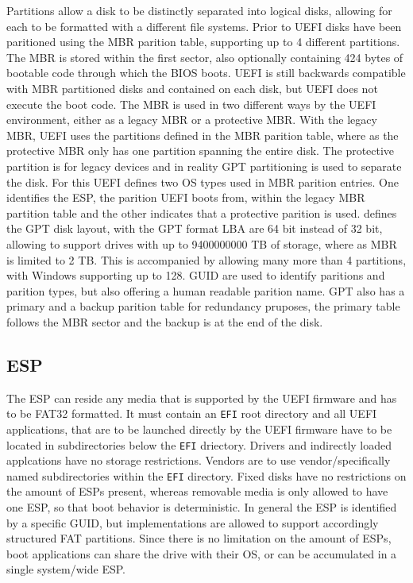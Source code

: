Partitions allow a disk to be distinctly separated into logical disks, allowing for each to be formatted with a different file systems.
Prior to \ac{UEFI} disks have been paritioned using the \ac{MBR} parition table, supporting up to 4 different partitions.
The \ac{MBR} is stored within the first sector, also optionally containing 424 bytes of bootable code through which the \ac{BIOS} boots\cite[13.3.1]{uefi-spec}.
\ac{UEFI} is still backwards compatible with \ac{MBR} partitioned disks and contained on each disk, but \ac{UEFI} does not execute the boot code.
The \ac{MBR} is used in two different ways by the \ac{UEFI} environment, either as a legacy \ac{MBR} or a protective \ac{MBR}.
With the legacy \ac{MBR}, \ac{UEFI} uses the partitions defined in the \ac{MBR} parition table, where as the protective \ac{MBR} only has one partition spanning the entire disk.
The protective partition is for legacy devices and in reality \ac{GPT} partitioning is used to separate the disk.
For this \ac{UEFI} defines two \ac{OS} types used in \ac{MBR} parition entries.
One identifies the \ac{ESP}, the parition \ac{UEFI} boots from, within the legacy \ac{MBR} partition table and the other indicates that a protective parition is used\cite[5]{uefi-spec}.
\cite[5]{uefi-spec} defines the \ac{GPT} disk layout, with the \ac{GPT} format \ac{LBA} are 64 bit instead of 32 bit, allowing to support drives with up to 9400000000 \ac{TB} of storage, where as \ac{MBR} is limited to 2 \ac{TB}.
This is accompanied by allowing many more than 4 partitions, with Windows supporting up to 128\cite{microsoft-windows-and-gpt-faq}.
\ac{GUID} are used to identify paritions and parition types, but also offering a human readable parition name.
\ac{GPT} also has a primary and a backup parition table for redundancy pruposes, the primary table follows the \ac{MBR} sector and the backup is at the end of the disk.

\subsection{\acf{ESP}}

The \ac{ESP} can reside any media that is supported by the \ac{UEFI} firmware and has to be \ac{FAT}32 formatted\cite[13.3]{uefi-spec}.
It must contain an \lstinline{EFI} root directory\cite[13.3.1.3]{uefi-spec} and all \ac{UEFI} applications, that are to be launched directly by the \ac{UEFI} firmware have to be located in subdirectories below the \lstinline{EFI} driectory\cite[13.3.1.3]{uefi-spec}. Drivers and indirectly loaded applcations have no storage restrictions. Vendors are to use vendor\-/specifically named subdirectories within the \lstinline{EFI} directory. Fixed disks have no restrictions on the amount of \acp{ESP} present, whereas removable media is only allowed to have one \ac{ESP}, so that boot behavior is deterministic. In general the \ac{ESP} is identified by a specific \ac{GUID}, but implementations are allowed to support accordingly structured \ac{FAT} partitions. Since there is no limitation on the amount of \acp{ESP}, boot applications can share the drive with their \ac{OS}, or can be accumulated in a single system\-/wide \ac{ESP}\cite[13.3.3]{uefi-spec}.


